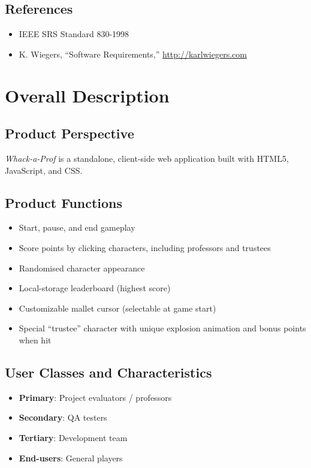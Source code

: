 \documentclass[11pt]{scrreprt}
\newcommand*{\product}{\textit{Whack-a-Prof}\xspace}
\begin{document}
\section{References}
\begin{itemize}
  \item IEEE SRS Standard 830-1998
  \item K. Wiegers, “Software Requirements,” \url{http://karlwiegers.com}
\end{itemize}

\chapter{Overall Description}

\section{Product Perspective}
\product is a standalone, client-side web application built with HTML5, JavaScript, and CSS.

\section{Product Functions}
\begin{itemize}
  \item Start, pause, and end gameplay
  \item Score points by clicking characters, including professors and trustees
  \item Randomised character appearance
  \item Local-storage leaderboard (highest score)
  \item Customizable mallet cursor (selectable at game start)
  \item Special “trustee” character with unique explosion animation and bonus points when hit
\end{itemize}

\section{User Classes and Characteristics}
\begin{itemize}
  \item \textbf{Primary}: Project evaluators / professors
  \item \textbf{Secondary}: QA testers
  \item \textbf{Tertiary}: Development team
  \item \textbf{End-users}: General players
\end{itemize}
\end{document}
